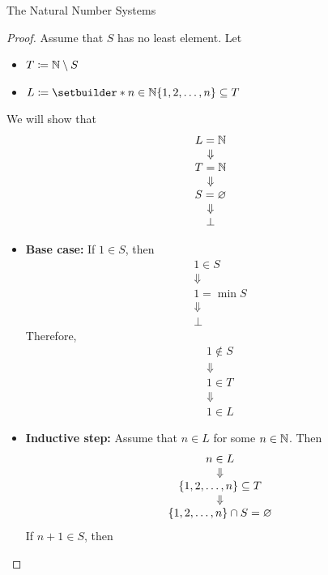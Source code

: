 \begin{section}{The Natural Number Systems}
\begin{proof}
    Assume that $S$ has no least element. Let
    \begin{itemize}
        \item $T \coloneqq \N \setminus S$
        \item $L \coloneqq \setbuilder*{n \in \N}{\set*{1, 2, \dots, n} \subseteq T}$
    \end{itemize}
    We will show that
    \[
    \begin{array}{c}
        L = \N \\
        \Downarrow \\
        T = \N \\
        \Downarrow \\
        S = \vnot \\
        \Downarrow \\
        \bot
    \end{array}
    \]
    \begin{itemize}
        \item \textbf{Base case:} If $1 \in S$, then
        \[
        \begin{array}{c}
            1 \in S \\
            \Downarrow \\
            1 = \min S \\
            \Downarrow \\
            \bot
        \end{array}
        \]
        Therefore,
        \[
        \begin{array}{c}
            1 \notin S \\
            \Downarrow \\
            1 \in T \\
            \Downarrow \\
            1 \in L
        \end{array}
        \]
        \item \textbf{Inductive step:} Assume that $n \in L$ for some $n \in \N$. Then
        \[
        \begin{array}{c}
            n \in L \\
            \Downarrow \\
            \set*{1, 2, \dots, n} \subseteq T \\
            \Downarrow \\
            \set*{1, 2, \dots, n} \cap S = \vnot
        \end{array}
        \]
        If $n + 1 \in S$, then 

\end{itemize}
\end{proof}
\end{section}
